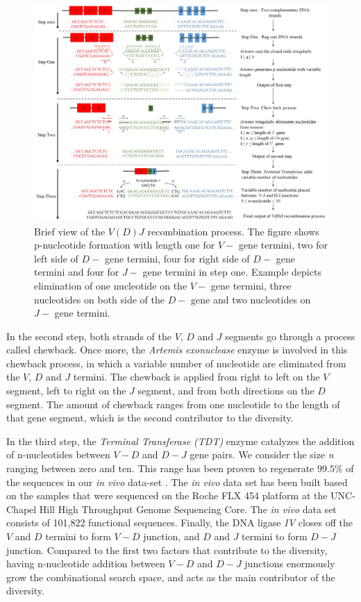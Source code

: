 \begin{figure}[htbp]
\begin{center}
\includegraphics[clip,width=1\columnwidth]{Figure/V(D)J.jpg}
\caption{Brief view of the $V(D)J$ recombination process. The figure shows p-nucleotide formation with length one for $V-$ gene termini, two for left side of $D-$ gene termini, four for right side of $D-$ gene termini and four for $J-$ gene termini in step one. Example depicts elimination of one nucleotide on the $V-$ gene termini, three nucleotides on both side of the $D-$ gene and two nucleotides on $J-$ gene termini.}
\label{fig:VDJ}
\end{center}
\end{figure} 
In the second step, both strands of the  $V$, $D$ and $J$ segments go through a process called chewback. Once more, the \emph{Artemis exonuclease} enzyme is involved in this chewback process, in which a variable number of nucleotide are eliminated from the $V$, $D$ and $J$ termini.  The chewback is applied from right to left on the $V$ segment, left to right on the $J$ segment, and from both directions on the $D$ segment. The amount of chewback ranges from one nucleotide to the length of that gene segment, which is the second contributor to the diversity.  

In the third step, the \emph{Terminal Transferase (TDT)} enzyme catalyzes the addition of n-nucleotides between $V-D$  and $D-J$  gene pairs. We consider the size \emph{n} ranging between zero and ten. This range has been proven to regenerate $99.5\% $ of the sequences in our \emph{in vivo} data-set \cite{b2}. The \emph{in vivo} data set has been built based on the samples that were sequenced on the Roche FLX 454 platform at the UNC-Chapel Hill High Throughput Genome Sequencing Core. The \emph{in vivo} data set consists of 101,822 functional sequences. Finally, the DNA ligase \emph{IV} closes off the $V$ and $D$ termini to form $V-D$ junction, and $D$ and $J$ termini to form $D-J$ junction. Compared to the first two factors that contribute to the diversity, having n-nucleotide addition between $V-D$ and $D-J$ junctions enormously grow the combinational search space, and acts as the main contributor of the diversity.
